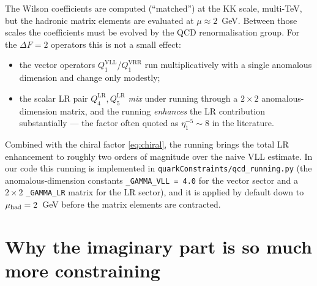 \documentclass[11pt]{article}
\newcommand{\QVLL}{Q_1^{\mathrm{VLL}}}
\newcommand{\QLRfour}{Q_4^{\mathrm{LR}}}
\newcommand{\QLRfive}{Q_5^{\mathrm{LR}}}
\newcommand{\code}[1]{\texttt{#1}}
\theoremstyle{definition}
\begin{document}
The Wilson coefficients are computed (``matched'') at the KK scale, multi-TeV,
but the hadronic matrix elements are evaluated at $\mu\approx2$~GeV. Between those
scales the coefficients must be evolved by the QCD renormalisation group. For the
$\Delta F=2$ operators this is not a small effect:
\begin{itemize}[leftmargin=1.4em]
\item the vector operators $\QVLL$/$Q_1^{\mathrm{VRR}}$ run multiplicatively with
a single anomalous dimension and change only modestly;
\item the scalar LR pair $\QLRfour,\QLRfive$ \emph{mix} under running through a
$2\times2$ anomalous-dimension matrix, and the running \emph{enhances} the LR
contribution substantially --- the factor often quoted as $\eta_1^{-5}\sim8$ in
the literature.
\end{itemize}
Combined with the chiral factor \eqref{eq:chiral}, the running brings the total
LR enhancement to roughly two orders of magnitude over the naive VLL estimate. In
our code this running is implemented in \code{quarkConstraints/qcd\_running.py}
(the anomalous-dimension constants \code{\_GAMMA\_VLL = 4.0} for the vector sector
and a $2\times2$ \code{\_GAMMA\_LR} matrix for the LR sector), and it is applied
by default down to $\mu_{\rm had}=2$~GeV before the matrix elements are
contracted.

\section{Why the imaginary part is so much more constraining}
\label{sec:imVsRe}
\end{document}
